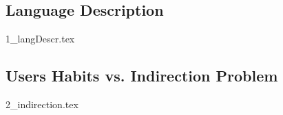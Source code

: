 \subsection{Language Description}
\label{sec:languageDescription}
{1_langDescr.tex}

\subsection{Users Habits vs. Indirection Problem}
\label{sec:indirection}
{2_indirection.tex}